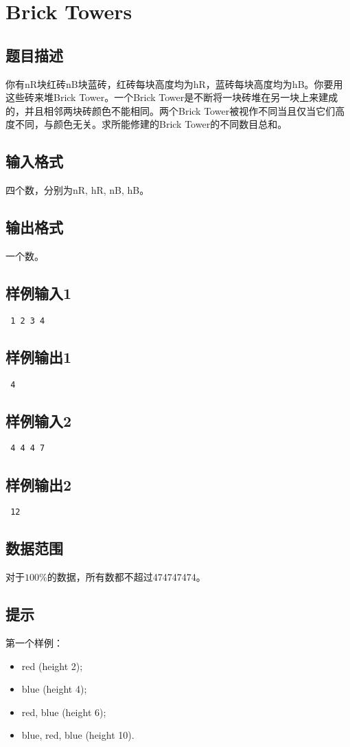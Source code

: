 \section{Brick Towers}
\subsection{题目描述}
\par
你有nR块红砖nB块蓝砖，红砖每块高度均为hR，蓝砖每块高度均为hB。你要用这些砖来堆Brick Tower。一个Brick Tower是不断将一块砖堆在另一块上来建成的，并且相邻两块砖颜色不能相同。两个Brick Tower被视作不同当且仅当它们高度不同，与颜色无关。求所能修建的Brick Tower的不同数目总和。
\subsection{输入格式}
\par 四个数，分别为nR, hR, nB, hB。
\subsection{输出格式}
\par 一个数。
\subsection{样例输入1}\par
{\tt
1 2 3 4
}
\subsection{样例输出1}\par
{\tt
4
}
\subsection{样例输入2}\par
{\tt
4 4 4 7
}
\subsection{样例输出2}\par
{\tt
12
}
\subsection{数据范围}
\par 对于$100\%$的数据，所有数都不超过474747474。
\subsection{提示}
\par 第一个样例：
\begin{itemize}
\item red (height 2); 
\item blue (height 4);
\item red, blue (height 6);
\item blue, red, blue (height 10).
\end{itemize}
